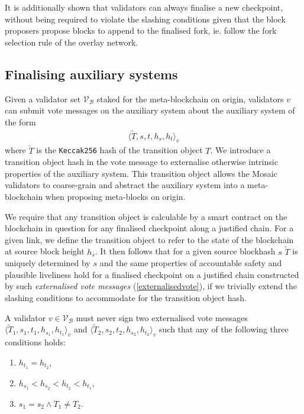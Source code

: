 \documentclass[12pt,a4paper]{article}
\begin{document}
It is additionally shown that validators can always finalise a new checkpoint, without being required to violate the slashing conditions given that the block proposers propose blocks to append to the finalised fork, ie. follow the fork selection rule of the overlay network.

\subsection{Finalising auxiliary systems}
Given a validator set $\mathcal{V}_\mathcal{B}$ staked for the meta-blockchain on origin, validators $v$ can submit vote messages on the auxiliary system about the auxiliary system of the form
\begin{align}\label{externalisedvote}
  \langle \tilde{T}, s, t, h_s, h_t \rangle_v
\end{align}
where $\tilde{T}$ is the \verb|Keccak256| hash of the transition object $T$. We introduce a transition object hash in the vote message to externalise otherwise intrinsic properties of the auxiliary system. This transition object allows the Mosaic validators to coarse-grain and abstract the auxiliary system into a meta-blockchain when proposing meta-blocks on origin.

We require that any transition object is calculable by a smart contract on the blockchain in question for any finalised checkpoint along a justified chain. For a given link, we define the transition object to refer to the state of the blockchain at source block height $h_s$. It then follows that for a given source blockhash $s$ $\tilde{T}$ is uniquely determined by $s$ and the same properties of accountable safety and plausible liveliness hold for a finalised checkpoint on a justified chain constructed by such \emph{externalised vote messages} (\ref{externalisedvote}), if we trivially extend the slashing conditions to accommodate for the transition object hash.

A validator $v \in \mathcal{V}_\mathcal{B}$ must never sign two externalised vote messages $\langle \tilde{T}_1, s_1, t_1, h_{s_1}, h_{t_1}\rangle_v$ and $\langle \tilde{T}_2, s_2, t_2, h_{s_2}, h_{t_2}\rangle_v$ such that any of the following three conditions holds:
\begin{enumerate}
  \item $h_{t_1} = h_{t_2}$,
  \item $h_{s_1} < h_{s_2} < h_{t_2} < h_{t_1}$,
  \item $s_1 = s_2 \land T_1 \neq T_2$.
\end{enumerate}
\end{document}
